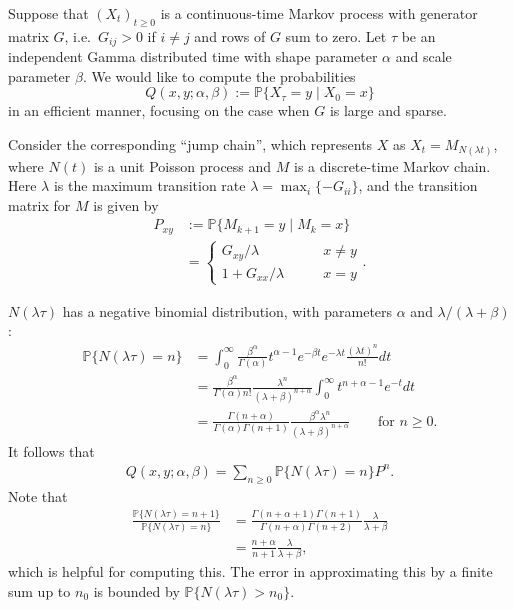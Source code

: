 \documentclass{article}
\renewcommand{\P}{\mathbb{P}}
\newcommand{\given}{\;\vert\;}
\begin{document}
Suppose that $(X_t)_{t\ge0}$ is a continuous-time Markov process with generator matrix $G$,
i.e.\ $G_{ij}>0$ if $i\neq j$ and rows of $G$ sum to zero.
Let $\tau$ be an independent Gamma distributed time with shape parameter $\alpha$ and scale parameter $\beta$.
We would like to compute the probabilities
\[
  Q(x,y;\alpha,\beta) := \P\{ X_\tau = y \given X_0 = x \} 
\]
in an efficient manner,
focusing on the case when $G$ is large and sparse.

Consider the corresponding ``jump chain'',
which represents $X$ as $X_t = M_{N(\lambda t)}$,
where $N(t)$ is a unit Poisson process and $M$ is a discrete-time Markov chain.
Here $\lambda$ is the maximum transition rate $\lambda = \max_i \{ - G_{ii} \}$,
and the transition matrix for $M$ is given by
\begin{align}
    P_{xy} &:= \P\{M_{k+1} = y \given M_k = x\} \\
        &= \begin{cases}  
                G_{xy}/\lambda \qquad & x\neq y \\
                1+G_{xx}/\lambda \qquad & x=y 
            \end{cases} .
\end{align}

$N(\lambda \tau)$ has a negative binomial distribution, with parameters $\alpha$ and $\lambda/(\lambda+\beta)$:
\begin{align}
  \P\{ N(\lambda \tau) = n \} &= \int_0^\infty \frac{ \beta^\alpha }{\Gamma(\alpha)} t^{\alpha-1} e^{-\beta t} e^{-\lambda t} \frac{ (\lambda t)^n }{ n! } dt \\
  &= \frac{ \beta^\alpha }{ \Gamma(\alpha) n! } \frac{\lambda^n}{(\lambda+\beta)^{n+\alpha}} \int_0^\infty t^{n+\alpha-1} e^{-t} dt \\
  &= \frac{ \Gamma(n+\alpha) }{ \Gamma(\alpha) \Gamma(n+1) } \frac{ \beta^\alpha \lambda^n }{(\lambda+\beta)^{n+\alpha}}\qquad \text{for } n \ge 0 .
\end{align}
It follows that
\begin{align}
    Q(x,y;\alpha,\beta) = \sum_{n \ge 0} \P\{ N(\lambda \tau) = n \} P^n  .
\end{align}
Note that 
\begin{align}
  \frac{ \P\{ N(\lambda \tau) = n+1 \} }{ \P\{ N(\lambda \tau) = n \} } &= \frac{ \Gamma(n+\alpha+1) \Gamma(n+1) }{ \Gamma(n+\alpha) \Gamma(n+2) } \frac{\lambda}{\lambda+\beta} \\
  &= \frac{ n+\alpha }{ n+1 } \frac{\lambda}{\lambda+\beta} ,
\end{align}
which is helpful for computing this.
The error in approximating this by a finite sum up to $n_0$ is bounded by $\P\{N(\lambda \tau)>n_0\}$.
\end{document}
